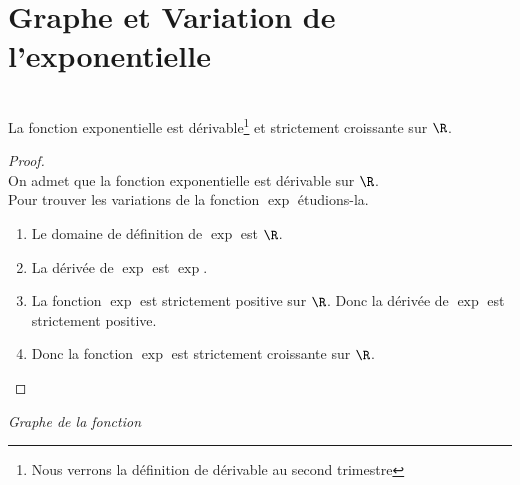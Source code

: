 \documentclass[12pt,fleqn]{report} %
\begin{document}
\section{Graphe et Variation de l'exponentielle}
\begin{theorem}\text{ }\\
	La fonction exponentielle est dérivable\footnote{Nous verrons la définition de dérivable au second trimestre} et strictement croissante sur $\R$.
\end{theorem}
\begin{proof}\text{ }\\
	On admet que la fonction exponentielle est dérivable sur $\R$. \\
	Pour trouver les variations de la fonction $\exp$ étudions-la.
	\begin{enumerate}
		\item Le domaine de définition de $\exp$ est $\R$.
		\item La dérivée de $\exp$ est $\exp$.
		\item La fonction $\exp$ est strictement positive sur $\R$. Donc la dérivée de $\exp$ est strictement positive.
		\item Donc la fonction $\exp$ est strictement croissante sur $\R$.
	\end{enumerate}
\end{proof}
\textit{Graphe de la fonction}\\

\begin{center}
\end{center}
\end{document}
